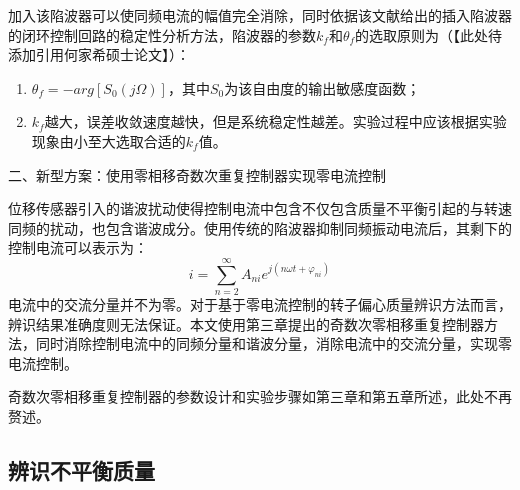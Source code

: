 加入该陷波器可以使同频电流的幅值完全消除，同时依据该文献给出的插入陷波器的闭环控制回路的稳定性分析方法，陷波器的参数$k_f$和$\theta _f$的选取原则为（【此处待添加引用何家希硕士论文】）：
\begin{enumerate}
	\item $\theta _f = - arg\left[ S_0(j\Omega) \right]$，其中$S_0$为该自由度的输出敏感度函数；
	\item $k_f$越大，误差收敛速度越快，但是系统稳定性越差。实验过程中应该根据实验现象由小至大选取合适的$k_f$值。
\end{enumerate}


二、新型方案：使用零相移奇数次重复控制器实现零电流控制

位移传感器引入的谐波扰动使得控制电流中包含不仅包含质量不平衡引起的与转速同频的扰动，也包含谐波成分。使用传统的陷波器抑制同频振动电流后，其剩下的控制电流可以表示为：
\begin{equation}
	\label{eq:iz_0i_h}
	{i} = \sum\limits_{n = 2}^\infty  {{A_{ni}}{e^{j(n\omega t + {\varphi _{ni}})}}} 
\end{equation}
电流中的交流分量并不为零。对于基于零电流控制的转子偏心质量辨识方法而言，辨识结果准确度则无法保证。本文使用第三章提出的奇数次零相移重复控制器方法，同时消除控制电流中的同频分量和谐波分量，消除电流中的交流分量，实现零电流控制。

奇数次零相移重复控制器的参数设计和实验步骤如第三章和第五章所述，此处不再赘述。

\subsection{辨识不平衡质量}

